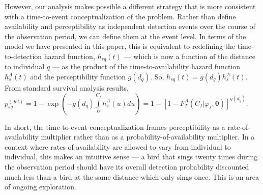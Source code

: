 \documentclass[useAMS,usenatbib,referee,12pt]{article}
\begin{document}
However, our analysis makes possible a different strategy that is more consistent with a time-to-event conceptualization of the problem.  
Rather than define availability and perceptibility as independent detection events over the course of the observation period, we can define them at the event level.  
In terms of the model we have presented in this paper, this is equivalent to redefining the time-to-detection hazard function, $h_{sq}(t)$ --- which is now a function of the distance to individual $q$ --- as the product of the time-to-availability hazard function $h_{s}^A(t)$ and the perceptibility function $g(d_q)$.  
So, $h_{sq}(t) = g(d_q) h_{s}^A(t)$.  
From standard survival analysis results, $p_{sq}^{(det)} = 1 - \exp\left(-g(d_q)\int\limits_0^{C_I} h_{s}^A(u)du\right) = 1 - \left[1 - F_T^A(C_I|\varphi_s, \boldsymbol{\theta}) \right]^{g(d_q)}$.

In short, the time-to-event conceptualization frames perceptibility as a rate-of-availability multiplier rather than as a probability-of-availability multiplier.  
In a context where rates of availability are allowed to vary from individual to individual, this makes an intuitive sense --- a bird that sings twenty times during the observation period should have its overall detection probability discounted much less than a bird at the same distance which only sings once.  
This is an area of ongoing exploration.



%
%
\end{document}
